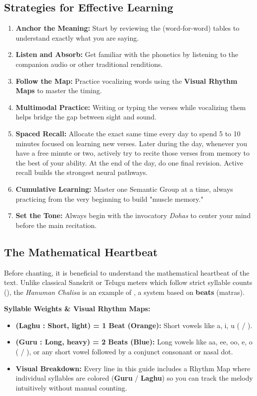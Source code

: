 \subsection*{Strategies for Effective Learning}
\begin{enumerate}
    \item \textbf{Anchor the Meaning:} Start by reviewing the  (word-for-word) tables to understand exactly what you are saying.
    \item \textbf{Listen and Absorb:} Get familiar with the phonetics by listening to the companion audio or other traditional renditions. 
    \item \textbf{Follow the Map:} Practice vocalizing words using the \textbf{Visual Rhythm Maps} to master the timing.
    \item \textbf{Multimodal Practice:} Writing or typing the verses while vocalizing them helps bridge the gap between sight and sound.
    \item \textbf{Spaced Recall:} Allocate the exact same time every day to spend 5 to 10 minutes focused on learning new verses. Later during the day, whenever you have a free minute or two, actively try to recite those verses from memory to the best of your ability. At the end of the day, do one final revision. Active recall builds the strongest neural pathways.
    \item \textbf{Cumulative Learning:} Master one Semantic Group at a time, always practicing from the very beginning to build "muscle memory."
    \item \textbf{Set the Tone:} Always begin with the invocatory \textit{Dohas} to center your mind before the main recitation.
\end{enumerate}

\subsection*{The Mathematical Heartbeat}
Before chanting, it is beneficial to understand the mathematical heartbeat of the text. Unlike classical Sanskrit or Telugu meters which follow strict syllable counts (), the \textit{Hanuman Chalisa} is an example of , a system based on \textbf{beats} (matras).

\textbf{Syllable Weights \& Visual Rhythm Maps:}
\begin{itemize}
    \item \textbf{ (Laghu : Short, light) = 1 Beat (\textcolor{laghuorange}{Orange}):} Short vowels like a, i, u ( / ).
    \item \textbf{ (Guru : Long, heavy) = 2 Beats (\textcolor{gurublue}{Blue}):} Long vowels like aa, ee, oo, e, o ( / ), or any short vowel followed by a conjunct consonant or nasal dot.
    \item \textbf{Visual Breakdown:} Every line in this guide includes a Rhythm Map where individual syllables are colored (\textcolor{gurublue}{\textbf{Guru}} / \textcolor{laghuorange}{\textbf{Laghu}}) so you can track the melody intuitively without manual counting.
\end{itemize}

